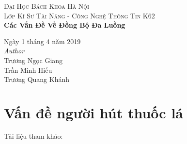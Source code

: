 \documentclass[a4paper]{article}
\begin{document}
\textsc{\LARGE Đại Học Bách Khoa Hà Nội} \\[1,5cm]
	\textsc{\large Lớp Kĩ Sư Tài Năng - Công Nghệ Thông Tin K62} \\[0.5cm]
	{\huge\bfseries Các Vấn Đề Về Đồng Bộ Đa Luồng}\\[0.4cm] 
	
		\begin{flushleft}
			\large
			Ngày 1 tháng 4 năm 2019 \\[0.5cm]
			\textit{Author}\\[0,3cm]
			   Trương Ngọc Giang \\
			   Trần Minh Hiếu  \\
			   Trương Quang Khánh \\
		\end{flushleft}
	\tableofcontents
	\newpage
	
	\section{Vấn đề người hút thuốc lá}
	Tài liệu tham khảo: \cite{littlebook4} \\
\end{document}
